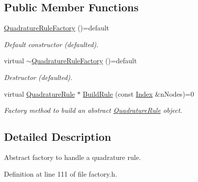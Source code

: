 \subsection*{Public Member Functions}
\begin{DoxyCompactItemize}
\item 
\hypertarget{classQuadratureRuleFactory_a2c094b9c41d5a88ae4e8e4ef1f665cf8}{\hyperlink{classQuadratureRuleFactory_a2c094b9c41d5a88ae4e8e4ef1f665cf8}{Quadrature\-Rule\-Factory} ()=default}\label{classQuadratureRuleFactory_a2c094b9c41d5a88ae4e8e4ef1f665cf8}

\begin{DoxyCompactList}\small\item\em Default constructor (defaulted). \end{DoxyCompactList}\item 
\hypertarget{classQuadratureRuleFactory_a0744c125ab0b59fb96f8d9d33491d594}{virtual \hyperlink{classQuadratureRuleFactory_a0744c125ab0b59fb96f8d9d33491d594}{$\sim$\-Quadrature\-Rule\-Factory} ()=default}\label{classQuadratureRuleFactory_a0744c125ab0b59fb96f8d9d33491d594}

\begin{DoxyCompactList}\small\item\em Destructor (defaulted). \end{DoxyCompactList}\item 
virtual \hyperlink{classQuadratureRule}{Quadrature\-Rule} $\ast$ \hyperlink{classQuadratureRuleFactory_adc9f82328b7cba8517e462e99c58335e}{Build\-Rule} (const \hyperlink{typedefs_8h_a2c726f8f32697958e9d6c2afecda531d}{Index} \&n\-Nodes)=0
\begin{DoxyCompactList}\small\item\em Factory method to build an abstract \hyperlink{classQuadratureRule}{Quadrature\-Rule} object. \end{DoxyCompactList}\end{DoxyCompactItemize}


\subsection{Detailed Description}
Abstract factory to handle a quadrature rule. 

Definition at line 111 of file factory.\-h.



